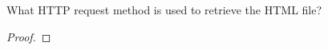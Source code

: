 \documentclass[../../main.tex]{subfiles}
\begin{document}
\begin{wts}
What HTTP request method is used to retrieve the HTML file? 
\end{wts}
\begin{proof}

\end{proof}
\end{document}
